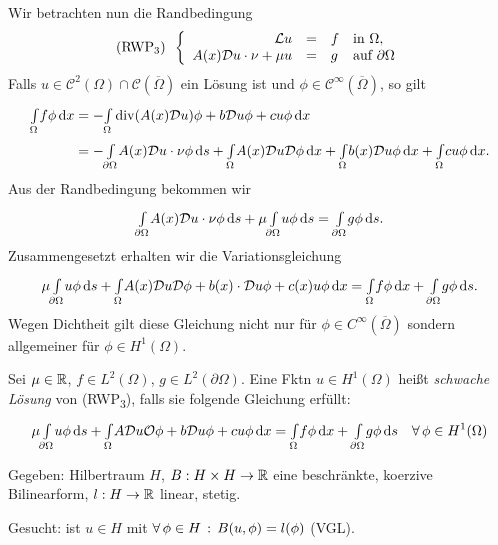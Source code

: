 \documentclass{cheat-sheet}
\newcommand{\Cont}{\mathcal{C}} %
\newcommand{\clos}[1]{\overline{#1}} %
\newcommand{\cOmega}{\clos{\Omega}} %
\newcommand{\bOmega}{\partial \Omega} %
\newcommand{\LL}{\mathcal{L}} %
\DeclareMathOperator{\dive}{div} %
\newcommand{\tss}[1]{\textsubscript{#1}} %
\renewcommand{\O}{\mathcal{O}} %
\newcommand{\DO}{\mathcal{D}} %
\begin{document}

\begin{prob}
  Wir betrachten nun die Randbedingung
  \[
    \text{(RWP\tss{3})} \enspace
    \left\{ \begin{array}{r c l l}
      \LL u & = & f & \text{in } \Omega, \\
      A(x) \DO u \cdot \nu + \mu u & = & g & \text{auf } \bOmega
    \end{array} \right.
  \]
  Falls $u \in \Cont^2(\Omega) \cap \Cont(\cOmega)$ ein Lösung ist und $\phi \in \Cont^\infty(\cOmega)$, so gilt
  \begin{align*}
    \Int{\Omega}{}{f \phi}{x}
    & = - \Int{\Omega}{}{\dive(A(x) \DO u) \phi + b \DO u \phi + c u \phi}{x} \\
    & = - \Int{\bOmega}{}{A(x) \DO u \cdot \nu \phi}{s} + \Int{\Omega}{}{A(x) \DO u \DO \phi}{x} + \Int{\Omega}{}{b(x) \DO u \phi}{x} + \Int{\Omega}{}{c u \phi}{x}.
  \end{align*}
  Aus der Randbedingung bekommen wir
  \[
    \Int{\partial \Omega}{}{A(x) \DO u \cdot \nu \phi}{s} + \mu \Int{\partial \Omega}{}{u \phi}{s} = \Int{\partial \Omega}{}{g \phi}{s}.
  \]
  Zusammengesetzt erhalten wir die Variationsgleichung
  \[
    \mu \Int{\partial \Omega}{}{u \phi}{s} + \Int{\Omega}{}{A(x) \DO u \DO \phi + b(x) \cdot \DO u \phi + c(x) u \phi}{x} = \Int{\Omega}{}{f \phi}{x} + \Int{\partial \Omega}{}{g \phi}{s}.
  \]
  Wegen Dichtheit gilt diese Gleichung nicht nur für $\phi \in C^\infty(\cOmega)$ sondern allgemeiner für $\phi \in H^1(\Omega)$.
\end{prob}

\begin{defn}
  Sei $\mu \in \mathbb{R}$, $f \in L^2(\Omega)$, $g \in L^2(\partial \Omega)$.
  Eine Fktn $u \in H^1(\Omega)$ heißt \emph{schwache Lösung} von (RWP\tss{3}), falls sie folgende Gleichung erfüllt:
  \[
    \mu \Int{\bOmega}{}{u \phi}{s} + \Int{\Omega}{}{A \DO u \O \phi + b \DO u \phi + c u \phi}{x} =
    \Int{\Omega}{}{f \phi}{x} + \Int{\bOmega}{}{g \phi}{s} \quad
    \forall \, \phi \in H^1(\Omega)
  \]
\end{defn}



Gegeben: Hilbertraum $H$, $B : H \times H \to \mathbb{R}$ eine beschränkte, koerzive Bilinearform, $l : H \to \mathbb{R}$ linear, stetig.

Gesucht: ist $u \in H$ mit $\forall \, {\phi \in H} \,:\, B(u, \phi) = l(\phi)$ (VGL).
\end{document}

